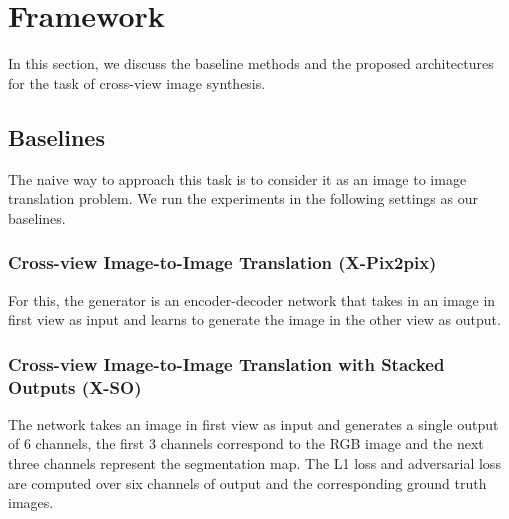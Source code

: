 \documentclass[times,twocolumn,final,authoryear]{elsarticle_modified}
\begin{document}
    






 \vspace{-5pt}
\section{Framework}
\label{sec:framework}
In this section, we discuss the baseline methods and the proposed architectures for the task of cross-view image synthesis. 


\subsection{Baselines}

The naive way to approach this task is to consider it as an image to image translation problem. We run the experiments in the following settings as our baselines. 


\vspace{-5pt}

\subsubsection{Cross-view Image-to-Image Translation (X-Pix2pix)}
For this, the generator is an encoder-decoder network that takes in an image in first view as input and learns to generate the image in the other view as output. 


\vspace{-5pt}

\subsubsection{Cross-view Image-to-Image Translation with Stacked Outputs (X-SO)} 
The network takes an image in first view as input and generates a single output of 6 channels, the first 3 channels correspond to the RGB image and the next three channels represent the segmentation map. The L1 loss and adversarial loss are computed over six channels of output and the corresponding ground truth images.
\end{document}

